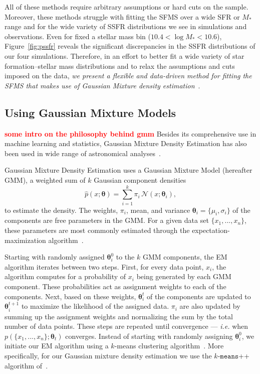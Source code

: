 \documentclass[preprint2,tighten]{aastex62}
\newcommand{\todo}[1]{{\bf \textcolor{red}{ #1}}}
\begin{document}
All of these methods require arbitrary assumptions or hard cuts on the 
sample. Moreover, these methods struggle with fitting the SFMS over a 
wide SFR or $M_*$ range and for the wide variety of SSFR distributions we see 
in simulations and observations. Even for fixed a stellar mass bin 
($10.4 < \log M_* < 10.6$), Figure~\ref{fig:pssfr} reveals the 
significant discrepancies in the SSFR distributions of our four simulations. 
Therefore, in an effort to better fit a wide variety of star formation--stellar
mass distributions and to relax the assumptions and cuts imposed on the data, 
\emph{we present a flexible and data-driven method for fitting the SFMS that 
makes use of Gaussian Mixture density estimation}~\citep[][]{Press:1992:NRC:148286, 9780471006268}. 

\subsection{Using Gaussian Mixture Models}
\todo{some intro on the philosophy behind gmm} 
Besides its comprehensive use in machine learning and statistics, Gaussian 
Mixture Density Estimation has also been used in wide range of astronomical 
analyses~\citep{hogg2010,bovy2011,lee2012,taylor2015}.

Gaussian Mixture Density Estimation uses a Gaussian Mixture Model 
(hereafter GMM), a weighted sum of $k$ Gaussian component densities 
\begin{equation} \label{eq:gmm}
\hat{p}(x;\bm{\theta}) = \sum\limits_{i=1}^{k} \pi_i \, \mathcal{N}(x; \bm{\theta}_i),
\end{equation}
to estimate the density. The weights, $\pi_i$, mean, and variance  
$\bm{\theta}_i=\{\mu_i, \sigma_i\}$ 
of the components are free parameters in the GMM. For a given data set 
$\{x_1, ..., x_n\}$, these parameters are most commonly estimated through
the expectation-maximization algorithm~\citep[EM;]{dempster1977,neal1998}. 

Starting with randomly assigned $\bm{\theta}_{i}^0$ to the $k$ GMM components, 
the EM algorithm iterates between two steps. First, for every data point, 
$x_i$, the algorithm computes for a probability of $x_i$ being generated by 
each GMM component. These probabilities act as assignment weights to each of
the components. Next, based on these weights, $\bm{\theta}_i^t$ of the components 
are updated to $\bm{\theta}_i^{t+1}$ to maximize the likelihood of the assigned 
data. $\pi_i$ are also updated by summing up the assignment weights and 
normalizing the sum by the total number of data points. These steps are 
repeated until convergence --- \emph{i.e.} when $p(\{x_1, ..., x_n\} ; \bm{\theta}_t)$ 
converges. Instead of starting with randomly assigning $\bm{\theta}_{i}^0$, 
we initiate our EM algorithm using a $k$-means clustering algorithm~\citep{lloyd1982}.
More specifically, for our Gaussian mixture density estimation we use 
the $k$-$\mathtt{means}$++ algorithm of~\cite{arthur2007}. 
\end{document}
